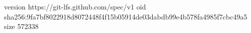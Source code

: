 version https://git-lfs.github.com/spec/v1
oid sha256:9fa7bf8022918d8072448f4f15b05914de03dabdb99e4b578fa4985f7cbc49a5
size 572338
